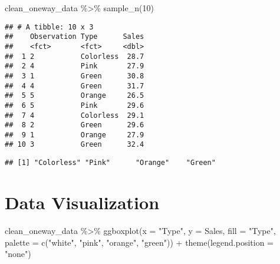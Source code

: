 \documentclass[
]{book}
\newenvironment{Shaded}{\begin{snugshade}}{\end{snugshade}}
\newcommand{\AttributeTok}[1]{\textcolor[rgb]{0.77,0.63,0.00}{#1}}
\newcommand{\DecValTok}[1]{\textcolor[rgb]{0.00,0.00,0.81}{#1}}
\newcommand{\FunctionTok}[1]{\textcolor[rgb]{0.00,0.00,0.00}{#1}}
\newcommand{\NormalTok}[1]{#1}
\newcommand{\SpecialCharTok}[1]{\textcolor[rgb]{0.00,0.00,0.00}{#1}}
\newcommand{\StringTok}[1]{\textcolor[rgb]{0.31,0.60,0.02}{#1}}
\begin{document}
\begin{Shaded}
\begin{Highlighting}[]
\NormalTok{clean\_oneway\_data }\SpecialCharTok{\%\textgreater{}\%} 
  \FunctionTok{sample\_n}\NormalTok{(}\DecValTok{10}\NormalTok{)}
\end{Highlighting}
\end{Shaded}

\begin{verbatim}
## # A tibble: 10 x 3
##    Observation Type      Sales
##    <fct>       <fct>     <dbl>
##  1 2           Colorless  28.7
##  2 4           Pink       27.9
##  3 1           Green      30.8
##  4 4           Green      31.7
##  5 5           Orange     26.5
##  6 5           Pink       29.6
##  7 4           Colorless  29.1
##  8 2           Green      29.6
##  9 1           Orange     27.9
## 10 3           Green      32.4
\end{verbatim}

\begin{Shaded}
\end{Shaded}

\begin{verbatim}
## [1] "Colorless" "Pink"      "Orange"    "Green"
\end{verbatim}

\hypertarget{data-visualization}{%
\chapter{Data Visualization}\label{data-visualization}}

\begin{Shaded}
\begin{Highlighting}[]
\NormalTok{clean\_oneway\_data }\SpecialCharTok{\%\textgreater{}\%} 
  \FunctionTok{ggboxplot}\NormalTok{(}\AttributeTok{x =} \StringTok{"Type"}\NormalTok{, }\AttributeTok{y =} \StringTok{\textquotesingle{}Sales\textquotesingle{}}\NormalTok{,}
            \AttributeTok{fill =} \StringTok{"Type"}\NormalTok{,}
            \AttributeTok{palette =} \FunctionTok{c}\NormalTok{(}\StringTok{"white"}\NormalTok{, }\StringTok{"pink"}\NormalTok{, }\StringTok{"orange"}\NormalTok{, }\StringTok{"green"}\NormalTok{)) }\SpecialCharTok{+} 
  \FunctionTok{theme}\NormalTok{(}\AttributeTok{legend.position =} \StringTok{"none"}\NormalTok{)}
\end{Highlighting}
\end{Shaded}
\end{document}
